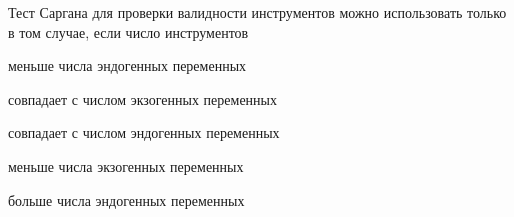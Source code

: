 
\begin{question}
Тест Саргана для проверки валидности инструментов можно использовать
только в том случае, если число инструментов
\begin{answerlist}
  \item меньше числа эндогенных переменных
  \item совпадает с числом экзогенных переменных
  \item совпадает с числом эндогенных переменных
  \item меньше числа экзогенных переменных
  \item больше числа эндогенных переменных
\end{answerlist}
\end{question}


